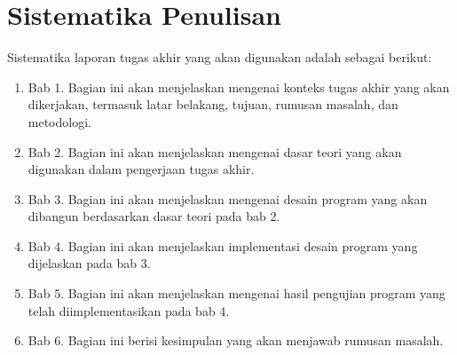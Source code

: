 \section {Sistematika Penulisan}

Sistematika laporan tugas akhir yang akan digunakan adalah sebagai berikut:

\begin{enumerate}
\item Bab 1. Bagian ini akan menjelaskan mengenai konteks tugas akhir yang akan dikerjakan, termasuk latar belakang, tujuan, rumusan masalah, dan metodologi.
\item Bab 2. Bagian ini akan menjelaskan mengenai dasar teori yang akan digunakan dalam pengerjaan tugas akhir.
\item Bab 3. Bagian ini akan menjelaskan mengenai desain program yang akan dibangun berdasarkan dasar teori pada bab 2.
\item Bab 4. Bagian ini akan menjelaskan implementasi desain program yang dijelaskan pada bab 3.
\item Bab 5. Bagian ini akan menjelaskan mengenai hasil pengujian program yang telah diimplementasikan pada bab 4.
\item Bab 6. Bagian ini berisi kesimpulan yang akan menjawab rumusan masalah.
\end{enumerate}
